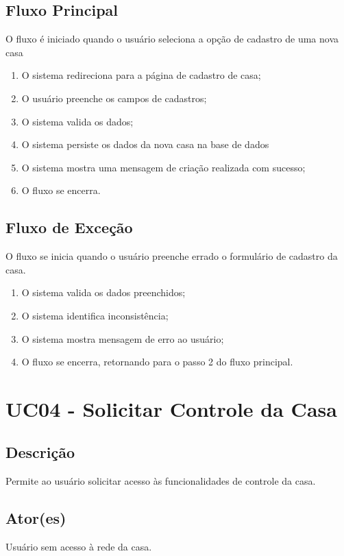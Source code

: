\begin{anexosenv}
    \subsection{Fluxo Principal}
        O fluxo é iniciado quando o usuário seleciona a opção de cadastro de uma nova casa
        \begin{enumerate}
            \item O sistema redireciona para a página de cadastro de casa;
            \item O usuário preenche os campos de cadastros;
            \item O sistema valida os dados;
            \item O sistema persiste os dados da nova casa na base de dados
            \item O sistema mostra uma mensagem de criação realizada com sucesso;
            \item O fluxo se encerra.
        \end{enumerate}
    \subsection{Fluxo de Exceção}
        O fluxo se inicia quando o usuário preenche errado o formulário de cadastro da casa.
        \begin{enumerate}
            \item O sistema valida os dados preenchidos;
            \item O sistema identifica inconsistência;
            \item O sistema mostra mensagem de erro ao usuário;
            \item O fluxo se encerra, retornando para o passo 2 do fluxo principal.
        \end{enumerate}

\section{UC04 \-- Solicitar Controle da Casa}
    \subsection{Descrição}
        Permite ao usuário solicitar acesso às funcionalidades de controle da casa.
    \subsection{Ator(es)}
        Usuário sem acesso à rede da casa.

\end{anexosenv}
